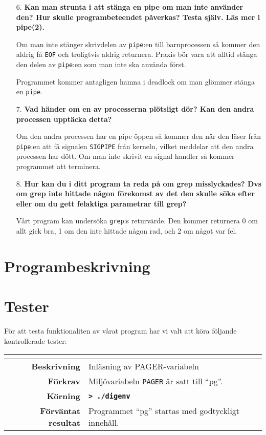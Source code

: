 \documentclass[a4paper,10pt,titlepage]{article}
\newcommand{\cmdline}[1]{\mbox{\textbf{\texttt{> #1}}}}
\begin{document}
\begin{enumerate}
	\item[6.] \textbf{\footnotesize Kan man strunta i att stänga en pipe om man inte använder den? Hur skulle programbeteendet påverkas? Testa själv. Läs mer i pipe(2).}

	Om man inte stänger skrivdelen av \verb!pipe!:en till barnprocessen så kommer den aldrig få \verb!EOF! och troligtvis aldrig returnera. Praxis bör vara att alltid stänga den delen av \verb!pipe!:en som man inte ska använda först.

	Programmet kommer antagligen hamna i deadlock om man glömmer stänga en \verb!pipe!.

	\item[7.] \textbf{\footnotesize Vad händer om en av processerna plötsligt dör? Kan den andra processen upptäcka detta?}

	Om den andra processen har en pipe öppen så kommer den när den läser från \verb!pipe!:en att få signalen \verb!SIGPIPE! från kerneln, vilket meddelar att den andra processen har dött. Om man inte skrivit en signal handler så kommer programmet att terminera.

	\item[8.] \textbf{\footnotesize Hur kan du i ditt program ta reda på om grep misslyckades? Dvs om grep inte hittade någon förekomst av det den skulle söka efter eller om du gett felaktiga parametrar till grep?}

	Vårt program kan undersöka \verb!grep!:s returvärde. Den kommer returnera 0 om allt gick bra, 1 om den inte hittade någon rad, och 2 om något var fel.	
\end{enumerate}

\newpage
\section{Programbeskrivning}

\newpage
\section{Tester}

För att testa funktionaliten av vårat program har vi valt att köra följande kontrollerade tester:

\begin{table}[H]
	\begin{tabularx}{\textwidth}{>{\bfseries}r  X }
		\multicolumn{2}{c}{\large\textbf{Testfall 1}} \\[0.1cm]
		\toprule	Beskrivning				& Inläsning av PAGER-variabeln \\
		\midrule	Förkrav					& Miljövariabeln \texttt{PAGER} är satt till ``pg''. \\
		\midrule	Körning					& \cmdline{./digenv} \\
		\midrule	Förväntat resultat		& Programmet ``pg'' startas med godtyckligt innehåll. \\
		\bottomrule
	\end{tabularx}
\end{table}
\end{document}
